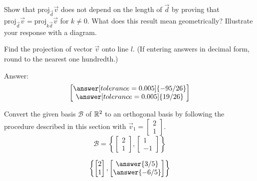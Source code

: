 \documentclass{ximera}
\begin{document}
    \begin{problem}\label{prob:proj3}
Show that $\mbox{proj}_{\vec{d}}\vec{v}$ does not depend on the length of $\vec{d}$ by proving that $\mbox{proj}_{\vec{d}}\vec{v}=\mbox{proj}_{k\vec{d}}\vec{v}$ for $k\neq 0$.  What does this result mean geometrically?  Illustrate your response with a diagram.
\end{problem}

\begin{problem}\label{prob:proj2}
Find the projection of vector $\vec{v}$ onto line $l$. (If entering answers in decimal form, round to the nearest one hundredth.)

\begin{center}
\end{center}

Answer:
$$\begin{bmatrix}\answer[tolerance=0.005]{-95/26}\\\answer[tolerance=0.005]{19/26}\end{bmatrix}$$
\end{problem}

  

\begin{problem}\label{GS1}
Convert the given basis $\mathcal{B}$ of $\mathbb{R}^2$ to an orthogonal basis by following the procedure described in this section with $\vec{v}_1=\begin{bmatrix}2\\ 1\end{bmatrix}$.
$$\mathcal{B} = \left\{ \begin{bmatrix}2\\ 1\end{bmatrix}, \begin{bmatrix}1\\ -1\end{bmatrix}\right\}$$

 $$\left\{\begin{bmatrix}2\\1\end{bmatrix},\begin{bmatrix}\answer{3/5}\\\answer{-6/5}\end{bmatrix}\right\}$$

\end{problem}

\end{document}
